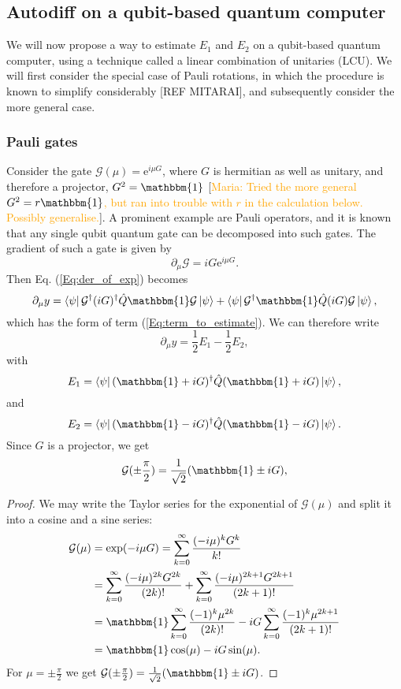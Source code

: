 \documentclass[aps,pra,10pt,twocolumn,groupedaddress,nofootinbib]{revtex4-1}
\theoremstyle{plain}
\newcommand{\I}{\mathbbm{1}} %
\newcommand{\ket}[1]{\ensuremath{\left| #1 \right \rangle}}
\newcommand{\bra}[1]{\ensuremath{\left \langle #1 \right |}}
\newcommand{\e}{\mathrm{e}}
\newcommand{\G}{\mathcal{G}}
\newcommand{\maria}[1]{\textcolor{orange}{Maria: #1}}
\begin{document}
\subsection{Autodiff on a qubit-based quantum computer}

We will now propose a way to estimate $E_1$ and $E_2$ on a qubit-based quantum computer, using a technique called a linear combination of unitaries (LCU). We will first consider the special case of Pauli rotations, in which the procedure is known to simplify considerably [REF MITARAI], and subsequently consider the more general case.\\

\subsubsection{Pauli gates}
Consider the gate $\G(\mu) = \e^{i \mu G}$, where $G$ is hermitian as well as unitary, and therefore a projector, $G^2 = \mathbbm{1}$ [\maria{Tried the more general $G^2 = r \mathbbm{1}$, but ran into trouble with $r$ in the calculation below. Possibly generalise.}]. A prominent example are Pauli operators, and it is known that any single qubit quantum gate can be decomposed into such gates. The gradient of such a gate is given by
\[ \partial_{\mu} \G = i G \e^{i \mu G}.    \]
Then Eq. (\ref{Eq:der_of_exp}) becomes
\[ \partial_{\mu} y =   \bra{\psi} \G^{\dagger} (iG)^{\dagger}  \hat{Q} \mathbbm{1} \G \ket{\psi} + \bra{\psi} \G^{\dagger} \mathbbm{1}  \hat{Q} (iG) \G \ket{\psi} , \]
which has the form of term (\ref{Eq:term_to_estimate}). We can therefore write
\[ \partial_{\mu} y = \frac{1}{2}E_1 - \frac{1}{2} E_2, \]
with
\[E_1 = \bra{\psi} (\mathbbm{1} + iG)^{\dagger} \hat{Q} (\mathbbm{1} + iG) \ket{\psi},\]
and
\[E_2= \bra{\psi}(\mathbbm{1} - iG)^{\dagger}  \hat{Q} (\mathbbm{1} - iG) \ket{\psi}. \]
Since $G$ is a projector, we get
\begin{equation}
	\G(\pm \frac{\pi}{2}) = \frac{1}{\sqrt{2}}(\I \pm iG),
	\label{Eq:Pauli_equality}
\end{equation}

\begin{proof}
We may write the Taylor series for the exponential of $\G(\mu)$
and split it into a cosine and a sine series:
\begin{align*}
\mathcal{G}(\mu) &= \exp(-i\mu G) = \sum_{k=0}^\infty \frac{(-i\mu)^k G^k}{k!}\\
&=
\sum_{k=0}^\infty \frac{(-i\mu)^{2k} G^{2k}}{(2k)!}
+\sum_{k=0}^\infty \frac{(-i\mu)^{2k+1} G^{2k+1}}{(2k+1)!}\\
&=
\I \sum_{k=0}^\infty \frac{(-1)^{k} \mu^{2k}}{(2k)!}
-i G \sum_{k=0}^\infty \frac{(-1)^{k} \mu^{2k+1}}{(2k+1)!}\\
&=
\I \cos(\mu)
-i G \sin(\mu).
\end{align*}
For $\mu = \pm \frac{\pi}{2}$ we get $\G(\pm \frac{\pi}{2}) = \frac{1}{\sqrt{2}}(\I \pm iG)$.
\end{proof}
\end{document}
